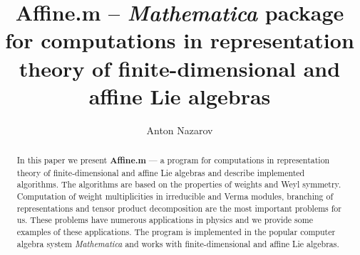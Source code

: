 \documentclass[preprint,12pt]{elsarticle}
\begin{document}
\begin{frontmatter}



\title{{\bf Affine.m} -- {\it Mathematica} package for computations in representation theory of finite-dimensional and affine Lie algebras}


\author[a,b]{Anton Nazarov}

\address[a]{Department of High Energy Physics, Faculty of physics, SPb State University\\ 198904, Sankt-Petersburg, Russia}
\address[b]{Chebyshev Laboratory, Faculty of Mathematics and Mechanics, SPb State University\\ 199178, Saint-Petersburg, Russia}

\begin{abstract}
In this paper we present {\bf Affine.m} --- a program for computations in representation theory of finite-dimensional and affine Lie algebras and describe implemented algorithms. The algorithms are based on the properties of weights and Weyl symmetry.  Computation of weight multiplicities in irreducible and Verma modules, branching of representations and tensor product decomposition are the most important problems for us. These problems have numerous applications in physics and we provide some examples of these applications. The program is implemented in the popular computer algebra system {\it Mathematica} and works with finite-dimensional and affine Lie algebras. 


\end{abstract}
\end{frontmatter}
\end{document}
